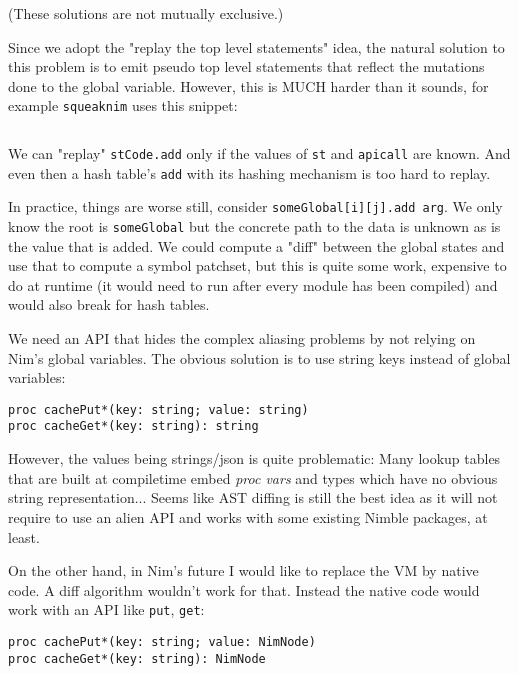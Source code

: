 (These solutions are not mutually exclusive.)

Since we adopt the "replay the top level statements" idea, the natural
solution to this problem is to emit pseudo top level statements that
reflect the mutations done to the global variable. However, this is MUCH
harder than it sounds, for example \texttt{squeaknim} uses this snippet:

\begin{verbatim}
\end{verbatim}

We can "replay" \texttt{stCode.add} only if the values of \texttt{st}
and \texttt{apicall} are known. And even then a hash table's
\texttt{add} with its hashing mechanism is too hard to replay.

In practice, things are worse still, consider
\texttt{someGlobal{[}i{]}{[}j{]}.add\ arg}. We only know the root is
\texttt{someGlobal} but the concrete path to the data is unknown as is
the value that is added. We could compute a "diff" between the global
states and use that to compute a symbol patchset, but this is quite some
work, expensive to do at runtime (it would need to run after every
module has been compiled) and would also break for hash tables.

We need an API that hides the complex aliasing problems by not relying
on Nim's global variables. The obvious solution is to use string keys
instead of global variables:

\begin{verbatim}
proc cachePut*(key: string; value: string)
proc cacheGet*(key: string): string
\end{verbatim}

However, the values being strings/json is quite problematic: Many lookup
tables that are built at compiletime embed \emph{proc vars} and types
which have no obvious string representation... Seems like AST diffing is
still the best idea as it will not require to use an alien API and works
with some existing Nimble packages, at least.

On the other hand, in Nim's future I would like to replace the VM by
native code. A diff algorithm wouldn't work for that. Instead the native
code would work with an API like \texttt{put}, \texttt{get}:

\begin{verbatim}
proc cachePut*(key: string; value: NimNode)
proc cacheGet*(key: string): NimNode
\end{verbatim}

